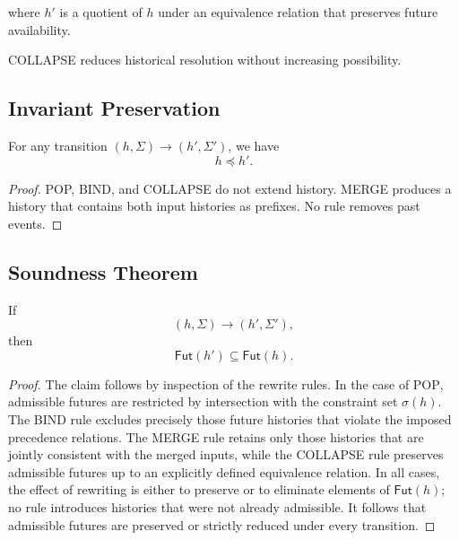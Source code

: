 \documentclass[11pt]{article}
\begin{document}
where $h'$ is a quotient of $h$ under an equivalence relation that preserves
future availability.

COLLAPSE reduces historical resolution without increasing possibility.

\subsection{Invariant Preservation}

\begin{lemma}
For any transition $(h, \Sigma) \rightarrow (h', \Sigma')$, we have
\[
h \preceq h'.
\]
\end{lemma}

\begin{proof}
POP, BIND, and COLLAPSE do not extend history. MERGE produces a history that
contains both input histories as prefixes. No rule removes past events.
\end{proof}

\subsection{Soundness Theorem}

\begin{theorem}[Soundness]
If
\[
(h, \Sigma) \longrightarrow (h', \Sigma'),
\]
then
\[
\mathsf{Fut}(h') \subseteq \mathsf{Fut}(h).
\]
\end{theorem}

\begin{proof}
The claim follows by inspection of the rewrite rules. In the case of
\textsc{POP}, admissible futures are restricted by intersection with the
constraint set $\sigma(h)$. The \textsc{BIND} rule excludes precisely those
future histories that violate the imposed precedence relations. The
\textsc{MERGE} rule retains only those histories that are jointly consistent
with the merged inputs, while the \textsc{COLLAPSE} rule preserves admissible
futures up to an explicitly defined equivalence relation. In all cases, the
effect of rewriting is either to preserve or to eliminate elements of
$\mathsf{Fut}(h)$; no rule introduces histories that were not already admissible.
It follows that admissible futures are preserved or strictly reduced under every
transition.
\end{proof}
\end{document}
